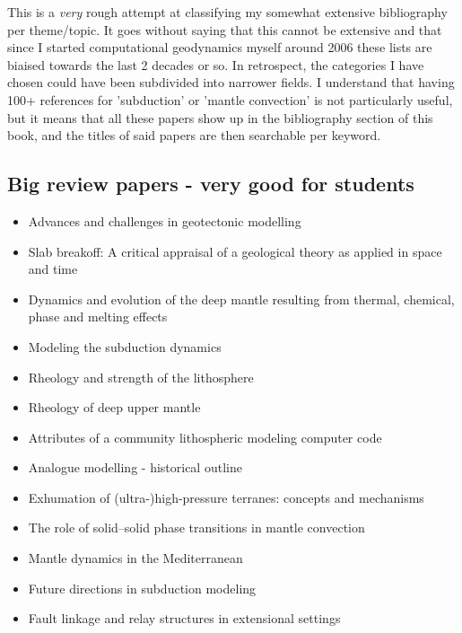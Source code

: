 This is a {\it very} rough attempt at classifying my somewhat extensive 
bibliography per theme/topic.
It goes without saying that this cannot be extensive and that since I 
started computational geodynamics myself around 2006 these lists are 
biaised towards the last 2 decades or so. 
In retrospect, the categories I have chosen could have been subdivided
into narrower fields. I understand that having 100+ references 
for 'subduction'  or 'mantle convection' is not particularly useful, 
but it means that all these papers show up in the bibliography section 
of this book, and the titles of said papers are then searchable per keyword.

\subsection*{Big review papers - very good for students}

\begin{itemize}
\item Advances and challenges in geotectonic modelling \cite{bufy14}
\item Slab breakoff: A critical appraisal of a geological theory as applied in space and time \cite{garm18}
\item Dynamics and evolution of the deep mantle resulting from thermal, chemical, phase and melting effects \cite{tack12}
\item Modeling the subduction dynamics \cite{kinc95,bill08}
\item Rheology and strength of the lithosphere \cite{kirb83,buro11}
\item Rheology of deep upper mantle \cite{kara10}
\item Attributes of a community lithospheric modeling computer code \cite{comc15}
\item Analogue modelling - historical outline \cite{koyi97}
\item Exhumation of (ultra-)high-pressure terranes: concepts and mechanisms \cite{warr13}
\item The role of solid–solid phase transitions in mantle convection \cite{fada17}
\item Mantle dynamics in the Mediterranean \cite{faba14}
\item Future directions in subduction modeling \cite{gery11}
\item Fault linkage and relay structures in extensional settings \cite{foro16}
\end{itemize}


